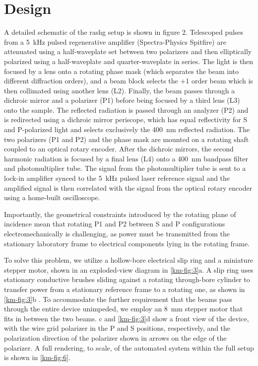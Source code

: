 \section{Design}
\label{sec:des}

A detailed schematic of the \gls{rashg} setup is shown in figure 2.
Telescoped pulses from a \qty{5}{kHz} pulsed regenerative amplifier (Spectra-Physics Spitfire) are attenuated using a half-waveplate set between two polarizers and then elliptically polarized using a half-waveplate and quarter-waveplate in series. 
The light is then focused by a lens onto a rotating phase mask (which separates the beam into different diffraction orders), and a beam block selects the +1 order beam which is then collimated using another lens (L2).
Finally, the beam passes through a dichroic mirror and a polarizer (P1) before being focused by a third lens (L3) onto the sample.
The reflected radiation is passed through an analyzer (P2) and is redirected using a dichroic mirror periscope, which has equal reflectivity for S and P-polarized light and selects exclusively the \qty{400}{nm} reflected radiation.
The two polarizers (P1 and P2) and the phase mask are mounted on a rotating shaft coupled to an optical rotary encoder.
After the dichroic mirrors, the second harmonic radiation is focused by a final lens (L4) onto a \qty{400}{nm} bandpass filter and photomultiplier tube.
The signal from the photomultiplier tube is sent to a lock-in amplifier synced to the \qty{5}{kHz} pulsed laser reference signal and the amplified signal is then correlated with the signal from the optical rotary encoder using a home-built oscilloscope. 

Importantly, the geometrical constraints introduced by the rotating plane of incidence mean that rotating P1 and P2 between S and P configurations electromechanically is challenging, as power must be transmitted from the stationary laboratory frame to electrical components lying in the rotating frame.

To solve this problem, we utilize a hollow-bore electrical slip ring and a miniature stepper motor, shown in an exploded-view diagram in \cref{km-fig:3}a.
A slip ring uses stationary conductive brushes sliding against a rotating through-bore cylinder to transfer power from a stationary reference frame to a rotating one, as shown in \cref{km-fig:3}b \citep{Argibay2010AsymmetricEnvironment}. 
To accommodate the further requirement that the beams pass through the entire device unimpeded, we employ an \qty{8}{mm} stepper motor that fits in between the two beams.
c and \cref{km-fig:3}d show a front view of the device, with the wire grid polarizer in the P and S positions, respectively, and the polarization direction of the polarizer shown in arrows on the edge of the polarizer.
A full rendering, to scale, of the automated system within the full setup is shown in \cref{km-fig:6}. 

